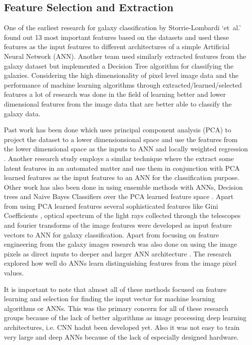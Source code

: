 \documentclass{article}
\begin{document}
\subsection{Feature Selection and Extraction}
One of the earliest research for galaxy classification by Storrie-Lombardi `et~al.' \cite{13_features} found out 13 most important features based on the datasets and used these features as the input features to different architectures of a simple Artificial Neural Network (ANN). Another team used similarly extracted features from the galaxy dataset but implemented a Decision Tree algorithm \cite{dt} for classifying the galaxies. Considering the high dimensionality of pixel level image data and the performance of machine learning algorithms through extracted/learned/selected features a lot of research was done in the field of learning better and lower dimensional features from the image data that are better able to classify the galaxy data. 

Past work has been done which uses principal component analysis (PCA) to project the dataset to a lower dimensionsional space and use the features from the lower dimensional space as the inputs to ANN and locally weighted regression \cite{nn_pca_lwr}. Another research study \cite{nn_pca} employs a similar technique where the extract some latent features in an automated matter and use them in conjunction with PCA learned features as the input features to an ANN for the classification purpose. Other work has also been done in using ensemble methods with ANNs, Decision trees and Naive Bayes Classifiers over the PCA learned feature space \cite{ensembles}. Apart from using PCA learned features several sophisticated features like Gini Coefficients \cite{gini}, optical spectrum of the light rays collected through the telescopes \cite{optical_spectrum} and fourier transforms of the image features \cite{fourier_pca} were developed as input feature vectors to ANN for galaxy classification. Apart from focusing on feature engineering from the galaxy images research was also done on using the image pixels as direct inputs to deeper and larger ANN architecture \cite{ann_geometric_ann_image}. The research explored how well do ANNs learn distinguishing features from the image pixel values. 

It is important to note that almost all of these methods focused on feature learning and selection for finding the input vector for machine learning algorithms or ANNs. This was the primary concern for all of these research groups because of the lack of better algorithms as image processing deep learning architectures, i.e. CNN hadnt been developed yet. Also it was not easy to train very large and deep ANNs because of the lack of especially designed hardware. 
\end{document}
